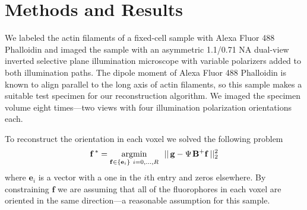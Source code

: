 \documentclass[letterpaper,10pt]{article}
\begin{document}
\section{Methods and Results}
We labeled the actin filaments of a fixed-cell sample with Alexa Fluor 488
Phalloidin and imaged the sample with an asymmetric 1.1/0.71 NA dual-view
inverted selective plane illumination microscope\cite{wu2017} with variable
polarizers added to both illumination paths. The dipole moment of Alexa Fluor
488 Phalloidin is known to align parallel to the long axis of actin filaments,
so this sample makes a suitable test specimen for our reconstruction
algorithm. We imaged the specimen volume eight times---two views with four
illumination polarization orientations each.

To reconstruct the orientation in each voxel we solved the following problem 
\begin{align}
\mathbf{f^{\thinspace *}}= \underset{\mathbf{f}\in\{\mathbf{e}_i\}\ i = 0,\dotsc,R}{\text{argmin}}
\ \ ||\thinspace\mathbf{g} - \Psi\hspace{0.1em}\mathbf{B}^+\mathbf{f}\thinspace||_2^2
\end{align}
where $\mathbf{e}_i$ is a vector with a one in the $i$th entry and zeros
elsewhere. By constraining $\mathbf{f}$ we are assuming that all of the
fluorophores in each voxel are oriented in the same direction---a reasonable
assumption for this sample.
\end{document}
